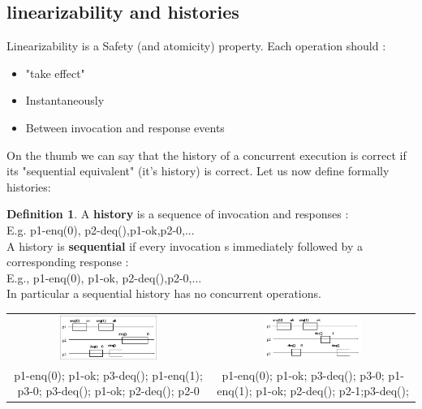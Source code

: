 \documentclass{article}
\theoremstyle{definition}
\newtheorem{definition}{Definition}[section]
\begin{document}
\subsection{linearizability and histories}

Linearizability is a Safety (and atomicity) property. Each operation should :
\begin{itemize}
\item "take effect"
\item Instantaneously
\item Between invocation and response events
\end{itemize}

On the thumb we can say that the history of a concurrent execution is correct if its "sequential equivalent" (it's history) is correct. Let us now define formally histories:

\begin{definition}
A \textbf{history} is a sequence of invocation and responses :\\ E.g. p1-enq(0), p2-deq(),p1-ok,p2-0,... \\
A history is \textbf{sequential} if every invocation s immediately followed by a corresponding response :\\ E.g., p1-enq(0), p1-ok, p2-deq(),p2-0,... \\
In particular a sequential history has no concurrent operations.
\end{definition}

\begin{center}
\begin{tabular}{c c}
\includegraphics[width=0.5\textwidth]{history1}&
\includegraphics[width=0.5\textwidth]{history2}\\
\tiny{p1-enq(0); p1-ok; p3-deq(); p1-enq(1); p3-0; p3-deq(); p1-ok; p2-deq(); p2-0} &
\tiny{p1-enq(0); p1-ok; p3-deq(); p3-0; p1-enq(1); p1-ok; p2-deq(); p2-1;p3-deq();}
\end{tabular}
\end{center}
\end{document}
